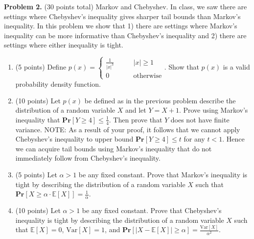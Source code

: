\documentclass[11pt]{article}
\newcommand{\Ex}[1]{\ensuremath{\mathbb{E}\left[#1\right]}}
\newcommand{\Var}[1]{\ensuremath{\text{Var}\left[#1\right]}}
\newcommand{\PPr}[1]{\ensuremath{\mathbf{Pr}\left[#1\right]}}
\begin{document}
\vskip 0.2in\noindent
\textbf{Problem 2.} (30 points total)
Markov and Chebyshev.
\vskip 0.1in\noindent
In class, we saw there are settings where Chebyshev's inequality gives sharper tail bounds than Markov's inequality. In this problem we show that 1) there are settings where Markov's inequality can be more informative than Chebyshev's inequality and 2) there are settings where either inequality is tight. 
\begin{enumerate}
\item (5 points)
Define $p(x)=\begin{cases}\frac{1}{|x|^3}\qquad&|x|\ge 1\\
0\qquad&\text{otherwise}\end{cases}$. 
\vskip 0.1in\noindent
Show that $p(x)$ is a valid probability density function. 
\item (10 points)
Let $p(x)$ be defined as in the previous problem describe the distribution of a random variable $X$ and let $Y=X+1$. 
Prove using Markov's inequality that $\PPr{Y\ge 4}\le\frac{1}{4}$. 
Then prove that $Y$ does not have finite variance. 
\vskip 0.1in\noindent
NOTE: As a result of your proof, it follows that we cannot apply Chebyshev's inequality to upper bound $\PPr{Y\ge 4}\le t$ for any $t<1$. Hence we can acquire tail bounds using Markov's inequality that do not immediately follow from Chebyshev's inequality.
\item (5 points)
Let $\alpha>1$ be any fixed constant. 
Prove that Markov's inequality is tight by describing the distribution of a random variable $X$ such that $\PPr{X\ge\alpha\cdot\Ex{X}}=\frac{1}{\alpha}$. 
\item (10 points)
Let $\alpha>1$ be any fixed constant. 
Prove that Chebyshev's inequality is tight by describing the distribution of a random variable $X$ such that $\Ex{X}=0$, $\Var{X}=1$, and $\PPr{|X-\Ex{X}|\ge\alpha}=\frac{\Var{X}}{\alpha^2}$. 
\end{enumerate}
\end{document}

